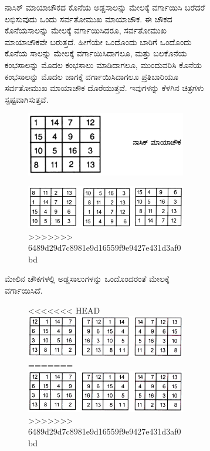 \begin{figure}[H]
\begin{itemize}
\begin{figure}[H]
	\item ನಾಸಿಕ್ ಮಾಯಾಚೌಕದ ಕೊನೆಯ ಅಡ್ಡಸಾಲನ್ನು ಮೇಲಕ್ಕೆ ವರ್ಗಾಯಿಸಿ ಬರೆದರೆ ಲಭಿಸುವುದು ಒಂದು ಸರ್ವತೋಮುಖ ಮಾಯಾಚೌಕ. ಈ ಚೌಕದ ಕೊನೆಯ\break ಸಾಲನ್ನು ಮೇಲಕ್ಕೆ ವರ್ಗಾಯಿಸಿದರೂ, ಸರ್ವತೋಮುಖ ಮಾಯಾಚೌಕವೇ ಬರುತ್ತದೆ. ಹೀಗೆಯೇ ಒಂದೊಂದು ಬಾರಿಗೆ ಒಂದೊಂದು ಕೊನೆಯ ಸಾಲನ್ನು ಮೇಲಕ್ಕೆ ವರ್ಗಾಯಿಸಿದಾಗಲೂ, ಮತ್ತು ಬಲಕೊನೆಯ ಕಂಭಸಾಲನ್ನು ಮೊದಲ ಕಂಭಸಾಲು ಮಾಡಿದಾಗಲೂ, ಮುಂದುವರಿಸಿ ಕೊನೆಯ ಕಂಭಸಾಲನ್ನು ಮೊದಲ ಜಾಗಕ್ಕೆ ವರ್ಗಾಯಿಸಿದಾಗಲೂ ಪ್ರತಿಬಾರಿಯೂ ಸರ್ವತೋಮುಖ ಮಾಯಾಚೌಕ ದೊರೆಯುತ್ತವೆ. ಇವುಗಳನ್ನು ಕೆಳಗಿನ ಚಿತ್ರಗಳು ಸ್ಪಷ್ಟವಾಗಿಸುತ್ತವೆ.
	\begin{figure}[H]
	\includegraphics[scale=.8]{src/figures/chap4/fig4.3.jpg}
	\end{figure}
	\begin{figure}[H]
	\includegraphics[scale=.8]{src/figures/chap4/fig4.4.jpg}
>>>>>>> 6489d29d7c8981e9d16559f9e9427e431d3af0bd
	\end{figure}

	ಮೇಲಿನ ಚೌಕಗಳಲ್ಲಿ ಅಡ್ಡಸಾಲುಗಳನ್ನು ಒಂದೊಂದರಂತೆ ಮೇಲಕ್ಕೆ ವರ್ಗಾಯಿಸಿದೆ.
	\begin{figure}[H]
<<<<<<< HEAD
	\includegraphics[scale=.8]{src/figures/chap4/fig4-5.jpg}
=======
	\includegraphics[scale=.8]{src/figures/chap4/fig4.5.jpg}
>>>>>>> 6489d29d7c8981e9d16559f9e9427e431d3af0bd
	\end{figure}
	

\end{figure}
\end{itemize}
\end{figure}
